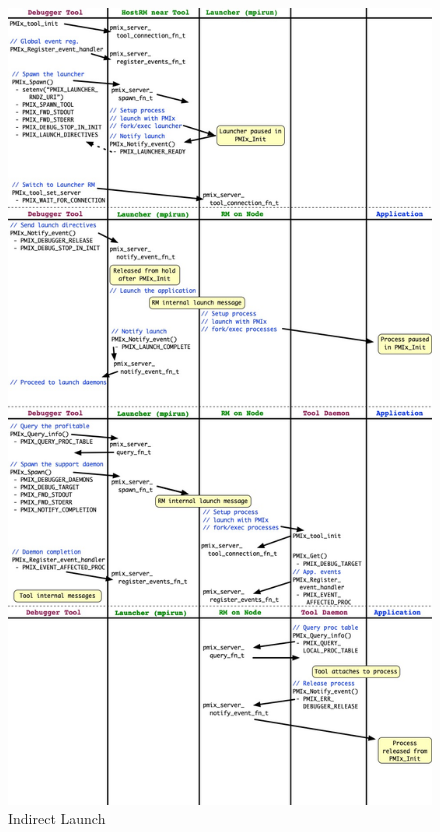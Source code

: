 \begingroup
\begin{figure}
  \begin{center}
    \includegraphics[width=\textwidth,height=\textheight,keepaspectratio]{figs/indirect-launch}
  \end{center}
  \caption{Indirect Launch}
  \label{fig:indirect_launch}
\end{figure}
\endgroup


